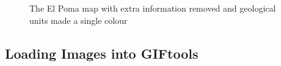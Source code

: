  \begin{figure} [h]
    \centering
    \caption{The El Poma map with extra information removed and geological units made a single colour}
    \label{fig:ElPoma_GEOL_MagSus_M2M_downsample8}
\end{figure}

\FloatBarrier
\subsection{Loading Images into GIFtools}
\label{subsec:Load Images into GIFtools}

